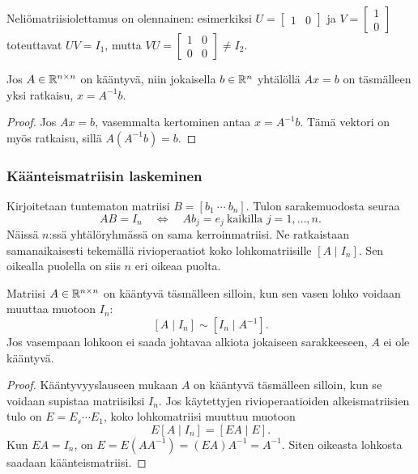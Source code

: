 \documentclass[11pt,a4paper]{amsart}
\begin{document}
  Neliömatriisiolettamus on olennainen: esimerkiksi
  $U=\left[
    \begin{smallmatrix}1&0
  \end{smallmatrix}\right]$ ja
  $V=\left[
    \begin{smallmatrix}1\\0
  \end{smallmatrix}\right]$
  toteuttavat $UV=I_1$, mutta
  $VU=\left[
    \begin{smallmatrix}1&0\\0&0
  \end{smallmatrix}\right]\ne I_2$.

  \begin{corollary}
    Jos $A\in\mathbb{R}^{n\times n}$ on kääntyvä, niin jokaisella
    $b\in\mathbb{R}^n$ yhtälöllä $Ax=b$ on täsmälleen yksi ratkaisu,
    $\boxed{x=A^{-1}b}$.
  \end{corollary}
  \begin{proof}
    Jos $Ax=b$, vasemmalta kertominen antaa $x=A^{-1}b$.
    Tämä vektori on myös ratkaisu, sillä $A(A^{-1}b)=b$.
  \end{proof}

  \subsubsection*{Käänteismatriisin laskeminen}

  Kirjoitetaan tuntematon matriisi $B=[b_1\ \cdots\ b_n]$.
  Tulon sarakemuodosta seuraa
  \[
    AB=I_n\quad\Longleftrightarrow\quad
    Ab_j=e_j\ \text{kaikilla }j=1,\ldots,n.
  \]
  Näissä $n$:ssä yhtälöryhmässä on sama kerroinmatriisi. Ne ratkaistaan
  samanaikaisesti tekemällä rivioperaatiot koko lohkomatriisille
  $[A\mid I_n]$. Sen oikealla puolella on siis $n$ eri oikeaa puolta.

  \begin{proposition}
    Matriisi $A\in\mathbb{R}^{n\times n}$ on kääntyvä täsmälleen silloin,
    kun sen vasen lohko voidaan muuttaa muotoon $I_n$:
    \[
      \boxed{[A\mid I_n]\sim[I_n\mid A^{-1}].}
    \]
    Jos vasempaan lohkoon ei saada johtavaa alkiota jokaiseen
    sarakkeeseen, $A$ ei ole kääntyvä.
  \end{proposition}
  \begin{proof}
    Kääntyvyyslauseen mukaan $A$ on kääntyvä täsmälleen silloin, kun
    se voidaan supistaa matriisiksi $I_n$. Jos käytettyjen
    rivioperaatioiden alkeismatriisien tulo on $E=E_s\cdots E_1$,
    koko lohkomatriisi muuttuu muotoon
    \[
      E[A\mid I_n]=[EA\mid E].
    \]
    Kun $EA=I_n$, on $E=E(AA^{-1})=(EA)A^{-1}=A^{-1}$.
    Siten oikeasta lohkosta saadaan käänteismatriisi.
  \end{proof}
\end{document}
